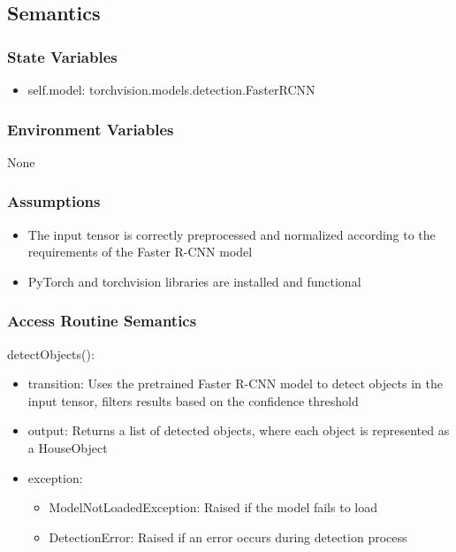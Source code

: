 \documentclass[12pt, titlepage]{article}
\begin{document}
\subsection{Semantics}

\subsubsection{State Variables}
\begin{itemize}
	\item self.model: torchvision.models.detection.FasterRCNN
\end{itemize}


\subsubsection{Environment Variables}
None

\subsubsection{Assumptions}
\begin{itemize}
  \item The input tensor is correctly preprocessed and normalized according to the requirements of the Faster R-CNN model
  \item PyTorch and torchvision libraries are installed and functional
\end{itemize}


\subsubsection{Access Routine Semantics}

\noindent detectObjects():
\begin{itemize}
\item transition: Uses the pretrained Faster R-CNN model to detect objects in the input tensor, filters results based on the confidence threshold
\item output: Returns a list of detected objects, where each object is represented as a HouseObject
\item exception: 
\begin{itemize}
  \item ModelNotLoadedException: Raised if the model fails to load
  \item DetectionError: Raised if an error occurs during detection process
\end{itemize}

\end{itemize}
\end{document}

